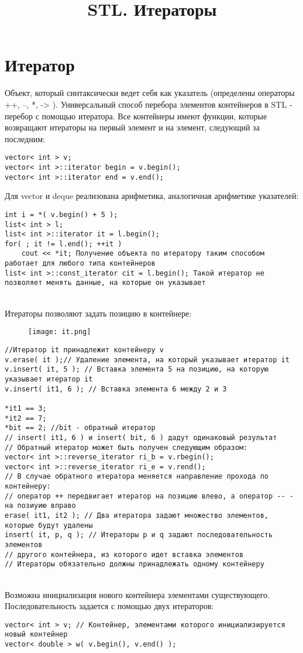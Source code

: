 \documentclass {article}
\date{}
\title{{STL. Итераторы}}
\begin{document}
\maketitle
\section{Итератор}
Объект, который синтаксически ведет себя как указатель (определены операторы ++, --, *, -> ).
Универсальный способ перебора элементов контейнеров в STL - перебор с помощью итератора.
Все контейнеры имеют функции, которые возвращают итераторы на первый элемент и на элемент, следующий за последним:
\begin{lstlisting}[caption=Example]
vector< int > v;
vector< int >::iterator begin = v.begin();
vector< int >::iterator end = v.end();
\end{lstlisting}
Для vector и deque реализована арифметика, аналогичная арифметике указателей:
\begin{lstlisting}[caption=Example]
int i = *( v.begin() + 5 );
list< int > l;
list< int >::iterator it = l.begin();
for( ; it != l.end(); ++it )
    cout << *it; Получение объекта по итератору таким способом работает для любого типа контейнеров
list< int >::const_iterator cit = l.begin(); Такой итератор не позволяет менять данные, на которые он указывает
\end{lstlisting}\\
Итераторы позволяют задать позицию в контейнере:
\begin{figure}[h!]
\centering
\texttt{[image: it.png]}
\caption{}
\end{figure}
\begin{lstlisting}[caption=Example]
//Итератор it принадлежит контейнеру v
v.erase( it );// Удаление элемента, на который указывает итератор it
v.insert( it, 5 ); // Вставка элемента 5 на позицию, на которую указывает итератор it
v.insert( it1, 6 ); // Вставка элемента 6 между 2 и 3

*it1 == 3;
*it2 == 7;
*bit == 2; //bit - обратный итератор
// insert( it1, 6 ) и insert( bit, 6 ) дадут одинаковый результат
// Обратный итератор может быть получен следующим образом:
vector< int >::reverse_iterator ri_b = v.rbegin();
vector< int >::reverse_iterator ri_e = v.rend();
// В случае обратного итератора меняется направление прохода по контейнеру:
// оператор ++ передвигает итератор на позицию влево, а оператор -- - на позиуию вправо
erase( it1, it2 ); // Два итератора задают множество элементов, которые будут удалены
insert( it, p, q ); // Итераторы p и q задают последовательность элементов
// другого контейнера, из которого идет вставка элементов
// Итераторы обязательно должны принадлежать одному контейнеру
\end{lstlisting}\\
Возможна инициализация нового контейнера элементами существующего. Последовательность задается с помощью двух итераторов:
\begin{lstlisting}[caption=Example]
vector< int > v; // Контейнер, элементами которого инициализируется новый контейнер
vector< double > w( v.begin(), v.end() );
\end{lstlisting}
\newpage
\end{document}
